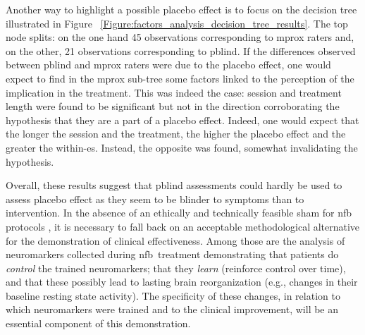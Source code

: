 Another way to highlight a possible placebo effect is to focus on the decision tree illustrated in Figure
~\ref{Figure:factors_analysis_decision_tree_results}.
The top node splits: on the one hand 45 observations corresponding to \gls{mprox} raters and, on the other, 
21 observations corresponding to \gls{pblind}. If the differences observed between \gls{pblind} and \gls{mprox} raters were 
due to the placebo effect, one would expect to find in the \gls{mprox} sub-tree some factors linked to the perception
of the implication in the treatment. This was indeed the case: session and treatment length were found to be significant but not in the
direction corroborating the hypothesis that they are a part of a placebo effect. Indeed, one would expect that the
longer the session and the treatment, the higher the placebo effect and the greater the within-\gls{es}. Instead, the opposite was found, 
somewhat invalidating the hypothesis. 

Overall, these results suggest that \gls{pblind} assessments could hardly be used to assess placebo effect as they seem to be blinder 
to symptoms than to intervention. In the absence of an ethically \citep{Holtmann2014} and technically \citep{Birbaumer1991} feasible sham 
for \gls{nfb} protocols \citep{World-Medical-Association2000}, it is necessary to fall back on an acceptable methodological alternative for 
the demonstration of clinical effectiveness. Among those are the analysis of neuromarkers collected during \gls{nfb} treatment demonstrating 
that patients do \emph{control} the trained neuromarkers; that they \emph{learn} (reinforce control over time), and that these possibly 
lead to lasting brain reorganization (e.g., changes in their baseline resting state activity). The specificity of these changes, in relation 
to which neuromarkers were trained and to the clinical improvement, will be an essential component of this demonstration.  

